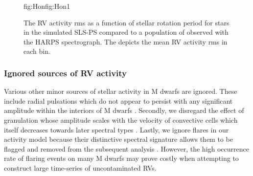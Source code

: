 \begin{figure}
\begin{ocg}{fig:Hon}{fig:Hon}{1}
  \end{ocg}
  \hspace{-0.6\hsize}%
  \caption[RV activity rms versus stellar rotation period.]
      {\small The RV activity rms as a function of stellar rotation period for stars in the simulated SLS-PS compared
    to a population of  observed with the HARPS
    spectrograph. The  depicts the mean
    RV activity rms in each \prot{} bin.}
  \label{BSfig:activityrms}
\end{figure}


\subsubsection{Ignored sources of RV activity}
Various other minor sources of stellar activity in M dwarfs are ignored. These include radial pulsations which 
do not appear to persist with any significant amplitude within the interiors of M dwarfs
\citep{rodriguezlopez15}. Secondly, we disregard the effect of granulation whose amplitude scales
with the velocity of convective cells which itself decreases towards later spectral types
\citep{dumusque11, meunier17}.
Lastly, we ignore flares in our activity model because their distinctive
spectral signature allows them to be flagged and removed from the subsequent analysis
\citep{schmidt12, angladaescude16}.
However, the high occurrence rate of flaring events on many M dwarfs may prove costly when attempting to
construct large time-series of uncontaminated RVs.


